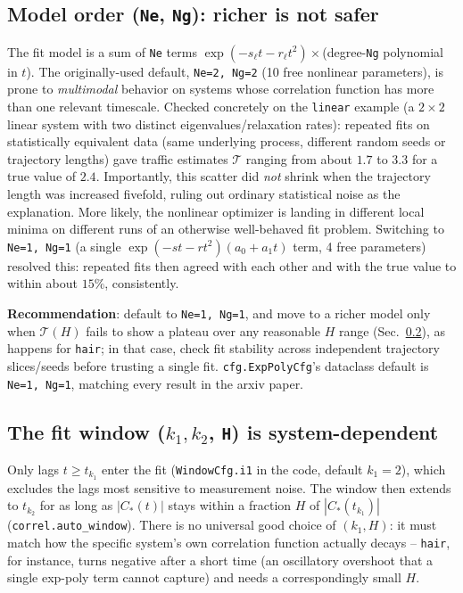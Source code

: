 \documentclass[11pt]{article}
\newcommand{\traffic}{\mathcal{T}}
\begin{document}
\subsection{Model order (\texttt{Ne}, \texttt{Ng}): richer is not safer}
\label{sec:model-order}

The fit model is a sum of \texttt{Ne} terms $\exp(-s_\ell t - r_\ell t^2)\times$(degree-\texttt{Ng} polynomial in $t$). The originally-used default, \texttt{Ne=2, Ng=2} (10 free nonlinear parameters), is prone to \emph{multimodal} behavior on systems whose correlation function has more than one relevant timescale. Checked concretely on the \texttt{linear} example (a $2\times2$ linear system with two distinct eigenvalues/relaxation rates): repeated fits on statistically equivalent data (same underlying process, different random seeds or trajectory lengths) gave traffic estimates $\traffic$ ranging from about $1.7$ to $3.3$ for a true value of $2.4$. Importantly, this scatter did \emph{not} shrink when the trajectory length was increased fivefold, ruling out ordinary statistical noise as the explanation. More likely, the nonlinear optimizer is landing in different local minima on different runs of an otherwise well-behaved fit problem.
Switching to \texttt{Ne=1, Ng=1} (a single $\exp(-st-rt^2)(a_0+a_1t)$ term, 4 free parameters) resolved this: repeated fits then agreed with each other and with the true value to within about $15\%$, consistently. 

\textbf{Recommendation}: default to \texttt{Ne=1, Ng=1}, and move to a richer model only when $\traffic(H)$ fails to show a plateau over any reasonable $H$ range (Sec.~\ref{sec:window}), as happens for \texttt{hair}; in that case, check fit stability across independent trajectory slices/seeds before trusting a single fit.
\texttt{cfg.ExpPolyCfg}'s dataclass default is \texttt{Ne=1, Ng=1}, matching every result in the arxiv paper.

\subsection{The fit window ($k_1,k_2$, \texttt{H}) is system-dependent}
\label{sec:window}

Only lags $t\ge t_{k_1}$ enter the fit (\texttt{WindowCfg.i1} in the code, default $k_1=2$), which excludes the lags most sensitive to measurement noise. The window then extends to $t_{k_2}$ for as long as $|C_*(t)|$ stays within a fraction $H$ of $|C_*(t_{k_1})|$ (\texttt{correl.auto\_window}). There is no universal good choice of $(k_1, H)$: it must match how the specific system's own correlation function actually decays -- \texttt{hair}, for instance, turns negative after a short time (an oscillatory overshoot that a single exp-poly term cannot capture) and needs a correspondingly small $H$.
\end{document}
